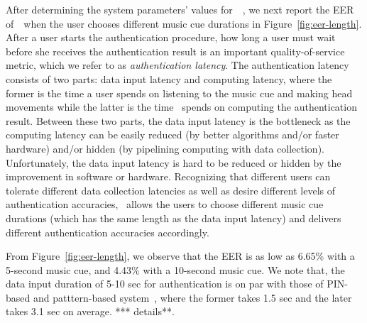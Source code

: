 After determining the system parameters' values for~\systemname~, we next report the EER of~\systemname~when the user chooses different music cue durations in Figure~\ref{fig:eer-length}. After a user starts the authentication procedure, how long a user must wait before she receives the authentication result is an important quality-of-service metric, which we refer to as \emph{authentication latency}.  The authentication latency consists of two parts: data input latency and computing latency, where the former is the time a user spends on listening to the music cue and making head movements while the latter is the time \systemname~spends on computing the authentication result. Between these two parts, the data input latency is the bottleneck as the computing latency can be easily reduced (by better algorithms and/or faster hardware) and/or hidden (by pipelining computing with data collection). Unfortunately, the data input latency is hard to be reduced or hidden by the improvement in software or hardware. Recognizing that different users can tolerate different data collection latencies as well as desire different levels of authentication accuracies, \systemname~allows the users to choose different music cue durations (which has the same length as the data input latency) and delivers different authentication accuracies accordingly.

From Figure~\ref{fig:eer-length}, we observe that the EER is as low as 6.65\% with a 5-second music cue, and 4.43\% with a 10-second music cue.
%
We note that, the data input duration of 5-10 sec for authentication is on par with those
of PIN-based and patttern-based system~\cite{von2013patterns}, where the former takes 1.5 sec and the later takes 3.1 sec on average. *** details**.


